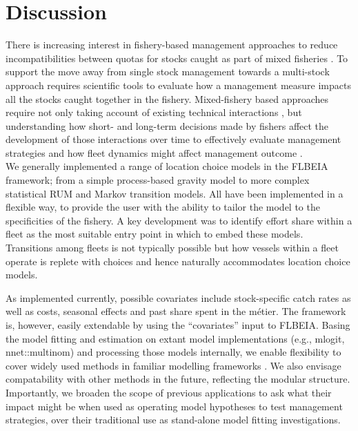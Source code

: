 \documentclass[12pt, halfline, a4paper]{ouparticle}
\begin{document}
\section{Discussion}
\label{dis}

There is increasing interest in fishery-based management approaches to reduce
incompatibilities between quotas for stocks caught as part of mixed fisheries
\citep{Ulrich2016, Garcia2020}. To support the move away from single stock
management towards a multi-stock approach requires scientific tools to evaluate
how a management measure impacts all the stocks caught together in the fishery.
Mixed-fishery based approaches require not only taking account of existing
technical interactions \citep{Ulrich2011, Garcia2017}, but understanding how
short- and long-term decisions made by fishers affect the development of those
interactions over time to effectively evaluate management strategies and how
fleet dynamics might affect management outcome \citep{Marchal2013}. \\

We generally implemented a range of location choice models in the FLBEIA framework; from a
simple process-based gravity model to more complex statistical RUM and Markov transition
models. All have been implemented in a flexible way, to provide the user with
the ability to tailor the model to the specificities of the fishery. A key development was to identify effort share within a fleet as the most suitable entry point in which to embed these models. Transitions among fleets is not typically possible but how vessels within a fleet operate is replete with choices and hence naturally accommodates location choice models. 

As implemented currently, possible covariates include stock-specific catch rates as well
as costs, seasonal effects and past share spent in the métier. The framework is, however,
easily extendable by using the ``covariates'' input to FLBEIA. Basing the model fitting and estimation on extant model implementations (e.g., mlogit, nnet::multinom) and processing those models internally, we enable flexibility to cover widely used methods in familiar modelling frameworks \citep{Venables2009, Dichmont2006, Hynes2016}. We also envisage compatability with other methods in the future, reflecting the modular structure. Importantly, we broaden the scope of previous applications to ask what their impact might be when used as operating model hypotheses to test management strategies, over their traditional use as stand-alone model fitting investigations.\\
\end{document}
